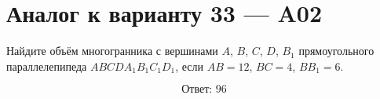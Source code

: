 \documentclass[12pt,a4paper]{article}
\begin{document}
\section*{Аналог к варианту 33 — A02}

Найдите объём многогранника с вершинами \(A\), \(B\), \(C\), \(D\), \(B_1\) прямоугольного параллелепипеда \(ABCDA_1B_1C_1D_1\), если \(AB=12\), \(BC=4\), \(BB_1=6\).

\begin{center}
\end{center}

\[
\boxed{\text{Ответ: }96}
\]
\end{document}
